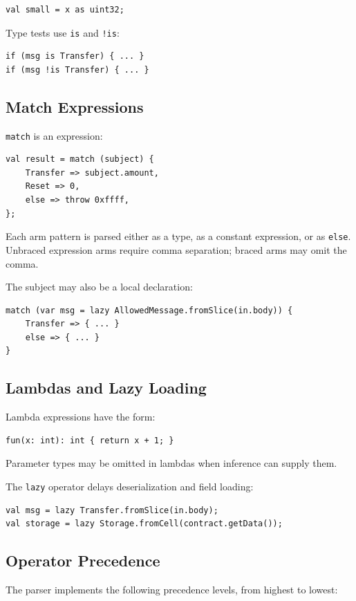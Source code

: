 \documentclass[12pt,oneside]{article}
\begin{document}
\begin{verbatim}
val small = x as uint32;
\end{verbatim}

Type tests use \verb|is| and \verb|!is|:

\begin{verbatim}
if (msg is Transfer) { ... }
if (msg !is Transfer) { ... }
\end{verbatim}

\subsection{Match Expressions}
\verb|match| is an expression:

\begin{verbatim}
val result = match (subject) {
    Transfer => subject.amount,
    Reset => 0,
    else => throw 0xffff,
};
\end{verbatim}

Each arm pattern is parsed either as a type, as a constant expression, or as
\verb|else|. Unbraced expression arms require comma separation; braced arms may
omit the comma.

The subject may also be a local declaration:

\begin{verbatim}
match (var msg = lazy AllowedMessage.fromSlice(in.body)) {
    Transfer => { ... }
    else => { ... }
}
\end{verbatim}

\subsection{Lambdas and Lazy Loading}
Lambda expressions have the form:

\begin{verbatim}
fun(x: int): int { return x + 1; }
\end{verbatim}

Parameter types may be omitted in lambdas when inference can supply them.

The \verb|lazy| operator delays deserialization and field loading:

\begin{verbatim}
val msg = lazy Transfer.fromSlice(in.body);
val storage = lazy Storage.fromCell(contract.getData());
\end{verbatim}

\subsection{Operator Precedence}
The parser implements the following precedence levels, from highest to lowest:
\end{document}
